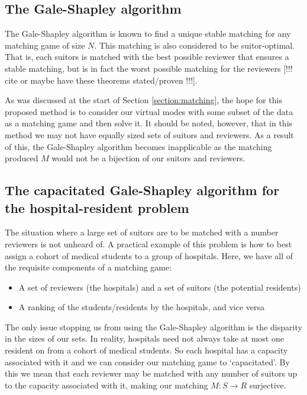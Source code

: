 \documentclass{article}
\theoremstyle{definition}
\begin{document}
\subsection{The Gale-Shapley algorithm}\label{subsection:galeshapley}

The Gale-Shapley algorithm is known to find a unique stable matching for any 
matching game of size $N$. This matching is also considered to be 
suitor-optimal. That is, each suitors is matched with the best possible reviewer
that ensures a stable matching, but is in fact the worst possible matching for 
the reviewers [!!! cite or maybe have these theorems stated/proven !!!]. 

As was discussed at the start of Section \ref{section:matching}, the hope for
this proposed method is to consider our virtual modes with some subset of the
data as a matching game and then solve it. It should be noted, however, that in
this method we may not have equally sized sets of suitors and reviewers. As a 
result of this, the Gale-Shapley algorithm becomes inapplicable as the matching
produced $M$ would not be a bijection of our suitors and reviewers.

\subsection{The capacitated Gale-Shapley algorithm for the hospital-resident 
		problem}\label{subsection:capacitated-galeshapley}

The situation where a large set of suitors are to be matched with a number
reviewers is not unheard of. A practical example of this problem is how to best
assign a cohort of medical students to a group of hospitals. Here, we have all
of the requisite components of a matching game:

\begin{itemize}
	\item A set of reviewers (the hospitals) and a set of suitors (the 
		potential residents) 
	\item A ranking of the students/residents by the hospitals, and vice
		versa
\end{itemize}

The only issue stopping us from using the Gale-Shapley algorithm is the 
disparity in the sizes of our sets. In reality, hospitals need not always take 
at most one resident on from a cohort of medical students. So each hospital has
a capacity associated with it and we can consider our matching game to
`capacitated'. By this we mean that each reviewer may be matched with any
number of suitors up to the capacity associated with it, making our matching $M
: S \to R$ surjective.
\end{document}
